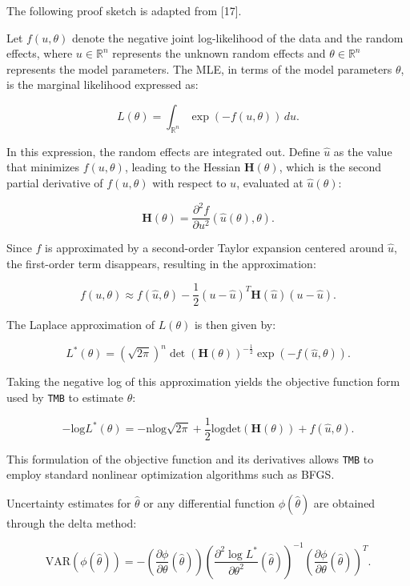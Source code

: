 \documentclass[
11pt, %
oneside, %
english, %
singlespacing, %
]{macthesis} %
\begin{document}
The following proof sketch is adapted from {[}17{]}.

Let \(f(u, \theta)\) denote the negative joint log-likelihood of the data and the random effects, where \(u \in \mathbb{R}^n\) represents the unknown random effects and \(\theta \in \mathbb{R}^n\) represents the model parameters. The MLE, in terms of the model parameters \(\theta\), is the marginal likelihood expressed as:

\[
L(\theta) = \int_{\mathbb{R}^n} \exp(-f(u, \theta)) \, du.
\]

In this expression, the random effects are integrated out. Define \(\hat{u}\) as the value that minimizes \(f(u, \theta)\), leading to the Hessian \(\mathbf{H}(\theta)\), which is the second partial derivative of \(f(u, \theta)\) with respect to \(u\), evaluated at \(\hat{u}(\theta)\):

\[
\mathbf{H}(\theta) = \frac{\partial^2 f}{\partial u^2}(\hat{u}(\theta), \theta).
\]

Since \(f\) is approximated by a second-order Taylor expansion centered around \(\hat{u}\), the first-order term disappears, resulting in the approximation:

\[
f(u, \theta) \approx f(\hat{u}, \theta) - \frac{1}{2} (u - \hat{u})^T \mathbf{H}(\hat{u}) (u - \hat{u}).
\]

The Laplace approximation of \(L(\theta)\) is then given by:

\[
L^*(\theta) = (\sqrt{2\pi})^n \det(\mathbf{H}(\theta))^{-\frac{1}{2}} \exp(-f(\hat{u}, \theta)).
\]

Taking the negative log of this approximation yields the objective function form used by \texttt{TMB} to estimate \(\theta\):

\begin{equation}
-\text{log}L^*(\theta) = -\text{n} \text{log}\sqrt{2\pi} + \frac{1}{2} \text{log} \text{det}(\mathbf{H}(\theta)) +f(\hat{u},\theta).
\label{eq:neg laplace}
\end{equation}

This formulation of the objective function and its derivatives allows \texttt{TMB} to employ standard nonlinear optimization algorithms such as BFGS.

Uncertainty estimates for \(\hat{\theta}\) or any differential function \(\phi(\hat{\theta})\) are obtained through the delta method:

\begin{equation}
\text{VAR}(\phi(\hat{\theta})) = -\left(\frac{\partial \phi}{\partial \theta}(\hat{\theta})\right) \left(\frac{\partial^2 \log L^*}{\partial \theta^2}(\hat{\theta})\right)^{-1} \left(\frac{\partial \phi}{\partial \theta}(\hat{\theta})\right)^T.
\label{eq:delta method}
\end{equation}
\end{document}
